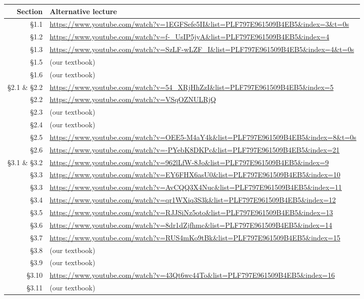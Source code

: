 \documentclass[12pt]{article}
\newcounter{ex}\setcounter{ex}{0}
\begin{document}
\tiny
\begin{tabular} {|r| l |}
\hline
Section  & Alternative lecture \\ \hline

\S1.1   & \url{https://www.youtube.com/watch?v=1EGFSefe5II&list=PLF797E961509B4EB5&index=3&t=0s} \\
\S1.2  &  \url{https://www.youtube.com/watch?v=f-_UsIP5jyA&list=PLF797E961509B4EB5&index=4} \\
\S1.3  & \url{https://www.youtube.com/watch?v=SzLF-wLZF_I&list=PLF797E961509B4EB5&index=4&t=0s}\\
\S1.5  &  (our textbook)   \\
\S1.6   &   (our textbook)   \\


\S2.1 \& \S2.2  & \url{https://www.youtube.com/watch?v=54_XRjHhZzI&list=PLF797E961509B4EB5&index=5} \\ \hline
\S2.2  & \url{https://www.youtube.com/watch?v=VSqOZNULRjQ} \\ \hline
\S2.3  & (our textbook)   \\ \hline
\S2.4 &  (our textbook)   \\ \hline
\S2.5 &  \url{https://www.youtube.com/watch?v=OEE5-M4aY4k&list=PLF797E961509B4EB5&index=8&t=0s} \\ \hline
\S2.6 &   \url{https://www.youtube.com/watch?v=-PYebK8DKPc&list=PLF797E961509B4EB5&index=21}  \\ \hline

\S3.1 \& \S3.2  &   \url{https://www.youtube.com/watch?v=962lLfW-8Jo&list=PLF797E961509B4EB5&index=9} \\ \hline

\S3.3 & \url{https://www.youtube.com/watch?v=EY6FHX6asU0&list=PLF797E961509B4EB5&index=10} \\ \hline
\S3.3 & \url{https://www.youtube.com/watch?v=AvCQQ3X4Nuc&list=PLF797E961509B4EB5&index=11}  \\ \hline
\S3.4 & \url{https://www.youtube.com/watch?v=qr1WXiq3S3k&list=PLF797E961509B4EB5&index=12} \\ \hline
\S3.5 & \url{https://www.youtube.com/watch?v=RJJSiNz5oto&list=PLF797E961509B4EB5&index=13} \\ \hline
\S3.6 & \url{https://www.youtube.com/watch?v=8dr1dZjfhmc&list=PLF797E961509B4EB5&index=14} \\ \hline
\S3.7 & \url{https://www.youtube.com/watch?v=RUS4mKo9tBk&list=PLF797E961509B4EB5&index=15} \\ \hline
\S3.8 & (our textbook)   \\ \hline
\S3.9 &  (our textbook)  \\ \hline
\S3.10 & \url{https://www.youtube.com/watch?v=43Qt6wc44To&list=PLF797E961509B4EB5&index=16} \\ \hline
\S3.11 & (our textbook)   \\ \hline


\end{tabular}
\end{document}
